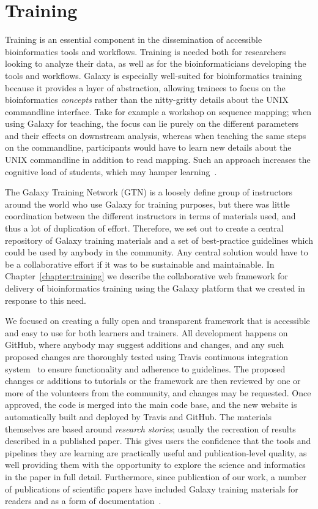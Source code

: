 \section{Training}
Training is an essential component in the dissemination of accessible bioinformatics tools and workflows. Training is needed both for researchers looking to analyze their data, as well as for the bioinformaticians developing the tools and workflows. Galaxy is especially well-suited for bioinformatics training because it provides a layer of abstraction, allowing trainees to focus on the bioinformatics \emph{concepts} rather than the nitty-gritty details about the UNIX commandline interface. Take for example a workshop on sequence mapping; when using Galaxy for teaching, the focus can lie purely on the different parameters and their effects on downstream analysis, whereas when teaching the same steps on the commandline, participants would have to learn new details about the UNIX commandline in addition to read mapping. Such an approach increases the cognitive load of students, which may hamper learning~\cite{paas2003cognitive}.

The Galaxy Training Network (GTN) is a loosely define group of instructors around the world who use Galaxy for training purposes, but there was little coordination between the different instructors in terms of materials used, and thus a lot of duplication of effort. Therefore, we set out to create a central repository of Galaxy training materials and a set of best-practice guidelines which could be used by anybody in the community. Any central solution would have to be a collaborative effort if it was to be sustainable and maintainable. In Chapter~\ref{chapter:training} we describe the collaborative web framework for delivery of bioinformatics training using the Galaxy platform that we created in response to this need.

We focused on creating a fully open and transparent framework that is accessible and easy to use for both learners and trainers. All development happens on GitHub, where anybody may suggest additions and changes, and any such proposed changes are thoroughly tested using Travis continuous integration system~\cite{travis-ci} to ensure functionality and adherence to guidelines. The proposed changes or additions to tutorials or the framework are then reviewed by one or more of the volunteers from the community, and changes may be requested. Once approved, the code is merged into the main code base, and the new website is automatically built and deployed by Travis and GitHub. The materials themselves are based around \emph{research stories}; usually the recreation of results described in a published paper. This gives users the confidence that the tools and pipelines they are learning are practically useful and publication-level quality, as well providing them with the opportunity to explore the science and informatics in the paper in full detail. Furthermore, since publication of our work, a number of publications of scientific papers have included Galaxy training materials for readers and as a form of documentation~\cite{TODO}.

